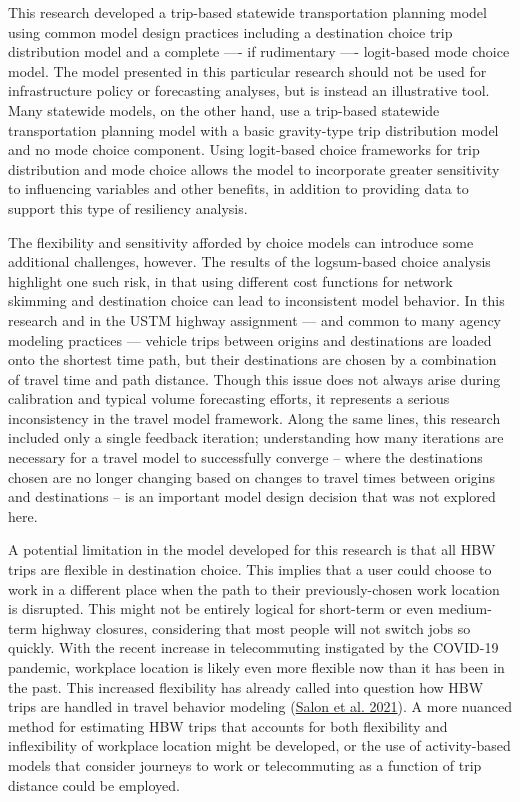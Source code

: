 \documentclass[]{ascelike-new}
\begin{document}
This research developed a trip-based statewide transportation planning
model using common model design practices including a destination choice
trip distribution model and a complete ---- if rudimentary ----
logit-based mode choice model. The model presented in this particular
research should not be used for infrastructure policy or forecasting
analyses, but is instead an illustrative tool. Many statewide models, on
the other hand, use a trip-based statewide transportation planning model
with a basic gravity-type trip distribution model and no mode choice
component. Using logit-based choice frameworks for trip distribution and
mode choice allows the model to incorporate greater sensitivity to
influencing variables and other benefits, in addition to providing data
to support this type of resiliency analysis.

The flexibility and sensitivity afforded by choice models can introduce
some additional challenges, however. The results of the logsum-based
choice analysis highlight one such risk, in that using different cost
functions for network skimming and destination choice can lead to
inconsistent model behavior. In this research and in the USTM highway
assignment --- and common to many agency modeling practices --- vehicle
trips between origins and destinations are loaded onto the shortest time
path, but their destinations are chosen by a combination of travel time
and path distance. Though this issue does not always arise during
calibration and typical volume forecasting efforts, it represents a
serious inconsistency in the travel model framework. Along the same
lines, this research included only a single feedback iteration;
understanding how many iterations are necessary for a travel model to
successfully converge -- where the destinations chosen are no longer
changing based on changes to travel times between origins and
destinations -- is an important model design decision that was not
explored here.

A potential limitation in the model developed for this research is that
all HBW trips are flexible in destination choice. This implies that a
user could choose to work in a different place when the path to their
previously-chosen work location is disrupted. This might not be entirely
logical for short-term or even medium-term highway closures, considering
that most people will not switch jobs so quickly. With the recent
increase in telecommuting instigated by the COVID-19 pandemic, workplace
location is likely even more flexible now than it has been in the past.
This increased flexibility has already called into question how HBW
trips are handled in travel behavior modeling
(\protect\hyperlink{ref-salon2021}{Salon et al. 2021}). A more nuanced
method for estimating HBW trips that accounts for both flexibility and
inflexibility of workplace location might be developed, or the use of
activity-based models that consider journeys to work or telecommuting as
a function of trip distance could be employed.
\end{document}

